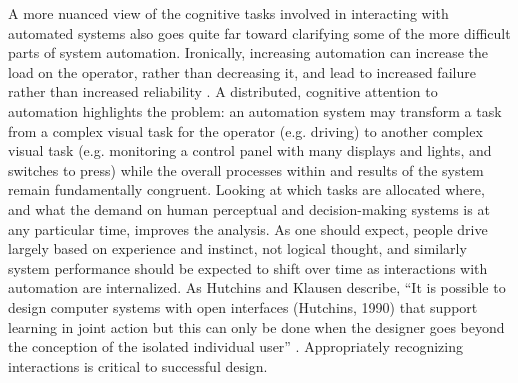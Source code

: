 A more nuanced view of the cognitive tasks involved in interacting
with automated systems also goes quite far toward clarifying some
of the more difficult parts of system automation. Ironically, increasing
automation can
increase the load on the operator, rather than decreasing it, and
lead to increased failure rather than increased
reliability \cite{parasuramanW}. A distributed,
cognitive attention to automation highlights the problem:  an
automation system may transform a task from a complex visual task for the
operator (e.g. driving) to another complex visual task (e.g. monitoring a control
panel with many displays and lights, and switches to press) while the
overall processes within and results of the system remain
fundamentally congruent. Looking at which tasks are
allocated where, and what the demand on human perceptual and
decision-making systems is at any particular time, improves the
analysis. As one should expect, 
people drive largely based on experience and
instinct, \cite{knaptonDriverless} not logical 
thought, and similarly system performance should be expected to shift
over time as interactions with automation are internalized. As
Hutchins and Klausen describe, ``It is possible to design computer systems with open
interfaces (Hutchins, 1990) that support learning in joint action but
this can only be done when the designer goes beyond the conception of
the isolated individual user'' \cite[p. 13]{hutchinsKlausen}.
Appropriately recognizing interactions is critical to successful design.




